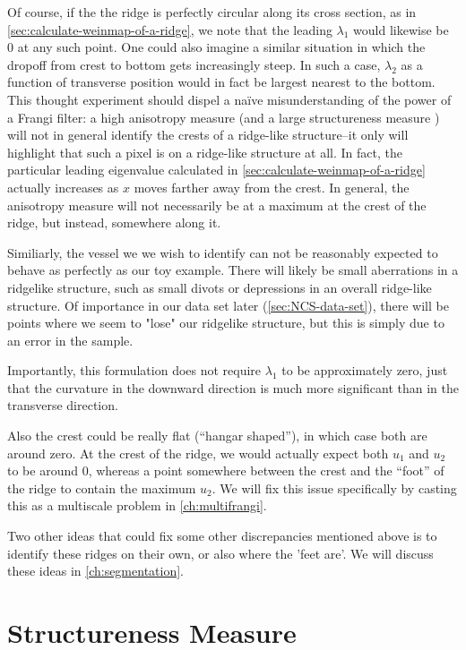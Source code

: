 Of course, if the the ridge is perfectly circular along its cross section, as in \cref{sec:calculate-weinmap-of-a-ridge}, we note that the leading  $\lambda_1$ would likewise be 0 at any such point.  One could also imagine a similar situation in which the dropoff from crest to bottom gets increasingly steep. In such a case, $\lambda_2$ as a function of transverse position would in fact be largest nearest to the bottom. This thought experiment should dispel a na\"{i}ve misunderstanding of the power of a Frangi filter: a high anisotropy measure (and a large structureness measure ) will not in general identify the crests of a ridge-like structure--it only will highlight that such a pixel is on a ridge-like structure at all. In fact, the particular leading eigenvalue calculated in \cref{sec:calculate-weinmap-of-a-ridge} actually increases as $x$ moves farther away from the crest. In general, the anisotropy measure will not necessarily be at a maximum at the crest of the ridge, but instead, somewhere along it.

Similiarly, the vessel we we wish to identify can not be reasonably expected to behave as perfectly as our toy example. There will likely be small aberrations in a ridgelike structure, such as small divots or depressions in an overall ridge-like structure. Of importance in our data set later (\cref{sec:NCS-data-set}), there will be points where we seem to "lose" our ridgelike structure,
but this is simply due to an error in the sample.

Importantly, this formulation does not require $\lambda_1$ to be approximately zero, just that the curvature in the downward direction is much more significant than in the transverse direction.

Also the crest could be really flat (``hangar shaped''), in which case both are around zero. At the crest of the ridge, we would actually expect both $u_1$ and $u_2$ to be around 0, whereas a point somewhere between the crest and the ``foot'' of the ridge to contain the maximum $u_2$. We will fix this issue specifically by casting this as a multiscale problem in \cref{ch:multifrangi}.

Two other ideas that could fix some other discrepancies mentioned above is to identify these ridges on their own, or also where the 'feet are'. We will discuss these ideas in \cref{ch:segmentation}.

\section{Structureness Measure} \label{sec:frangi-structureness}


